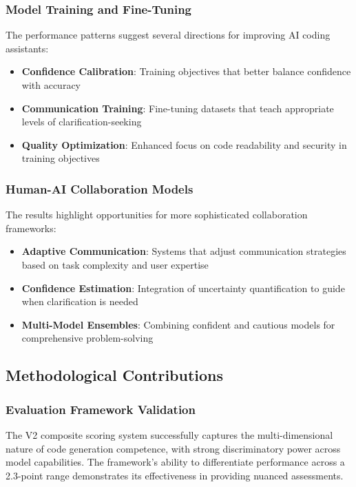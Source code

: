 \documentclass[conference]{IEEEtran}
\begin{document}
\subsubsection{Model Training and Fine-Tuning}

The performance patterns suggest several directions for improving AI coding assistants:

\begin{itemize}
    \item \textbf{Confidence Calibration}: Training objectives that better balance confidence with accuracy
    \item \textbf{Communication Training}: Fine-tuning datasets that teach appropriate levels of clarification-seeking
    \item \textbf{Quality Optimization}: Enhanced focus on code readability and security in training objectives
\end{itemize}

\subsubsection{Human-AI Collaboration Models}

The results highlight opportunities for more sophisticated collaboration frameworks:

\begin{itemize}
    \item \textbf{Adaptive Communication}: Systems that adjust communication strategies based on task complexity and user expertise
    \item \textbf{Confidence Estimation}: Integration of uncertainty quantification to guide when clarification is needed
    \item \textbf{Multi-Model Ensembles}: Combining confident and cautious models for comprehensive problem-solving
\end{itemize}

\subsection{Methodological Contributions}

\subsubsection{Evaluation Framework Validation}

The V2 composite scoring system successfully captures the multi-dimensional nature of code generation competence, with strong discriminatory power across model capabilities. The framework's ability to differentiate performance across a 2.3-point range demonstrates its effectiveness in providing nuanced assessments.
\end{document}
